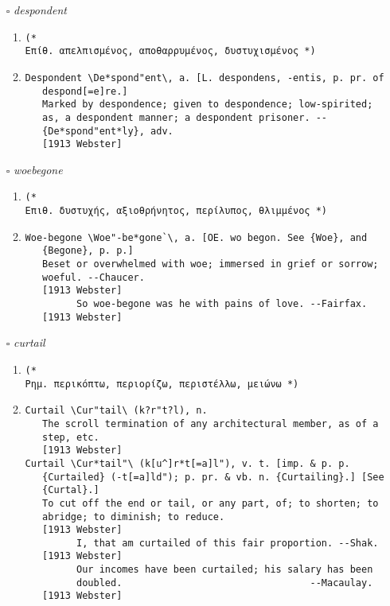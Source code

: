 \documentclass{article}
\begin{document}
\begin{itemize}
\item[$\square$] \emph{ despondent }
\begin{enumerate}
\item{
\begin{lstlisting}
(* 
Επίθ. απελπισμένος, αποθαρρυμένος, δυστυχισμένος *)
\end{lstlisting}}
\item{
\begin{lstlisting}
Despondent \De*spond"ent\, a. [L. despondens, -entis, p. pr. of
   despond[=e]re.]
   Marked by despondence; given to despondence; low-spirited;
   as, a despondent manner; a despondent prisoner. --
   {De*spond"ent*ly}, adv.
   [1913 Webster]
\end{lstlisting}}
\end{enumerate}
\item[$\square$] \emph{ woebegone }
\begin{enumerate}
\item{
\begin{lstlisting}
(* 
Επιθ. δυστυχής, αξιοθρήνητος, περίλυπος, θλιμμένος *)
\end{lstlisting}}
\item{
\begin{lstlisting}
Woe-begone \Woe"-be*gone`\, a. [OE. wo begon. See {Woe}, and
   {Begone}, p. p.]
   Beset or overwhelmed with woe; immersed in grief or sorrow;
   woeful. --Chaucer.
   [1913 Webster]
         So woe-begone was he with pains of love. --Fairfax.
   [1913 Webster]
\end{lstlisting}}
\end{enumerate}
\item[$\square$] \emph{ curtail }
\begin{enumerate}
\item{
\begin{lstlisting}
(* 
Ρημ. περικόπτω, περιορίζω, περιστέλλω, μειώνω *)
\end{lstlisting}}
\item{
\begin{lstlisting}
Curtail \Cur"tail\ (k?r"t?l), n.
   The scroll termination of any architectural member, as of a
   step, etc.
   [1913 Webster]
Curtail \Cur*tail"\ (k[u^]r*t[=a]l"), v. t. [imp. & p. p.
   {Curtailed} (-t[=a]ld"); p. pr. & vb. n. {Curtailing}.] [See
   {Curtal}.]
   To cut off the end or tail, or any part, of; to shorten; to
   abridge; to diminish; to reduce.
   [1913 Webster]
         I, that am curtailed of this fair proportion. --Shak.
   [1913 Webster]
         Our incomes have been curtailed; his salary has been
         doubled.                                 --Macaulay.
   [1913 Webster]
\end{lstlisting}}
\end{enumerate}


\end{itemize}
\end{document}
